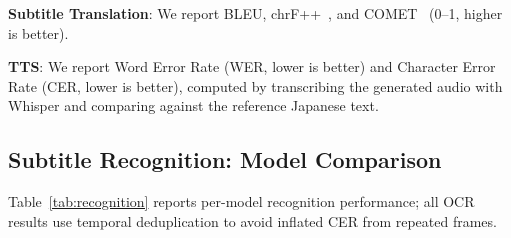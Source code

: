 \documentclass[journal]{IEEEtran}
\begin{document}
\textbf{Subtitle Translation}: We report BLEU, chrF++~\cite{popovic2015chrf}, and COMET~\cite{rei2020comet} (0--1, higher is better).

\textbf{TTS}: We report Word Error Rate (WER, lower is better) and Character Error Rate (CER, lower is better), computed by transcribing the generated audio with Whisper and comparing against the reference Japanese text.

\subsection{Subtitle Recognition: Model Comparison}
\label{sec:ocr_comparison}

Table~\ref{tab:recognition} reports per-model recognition performance; all OCR results use temporal deduplication to avoid inflated CER from repeated frames.
\end{document}
